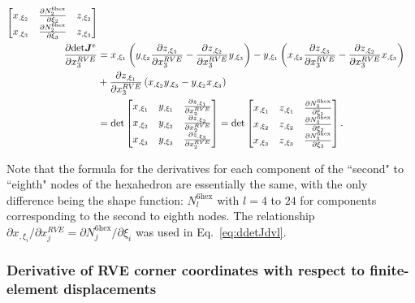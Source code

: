 \begin{align}
\begin{bmatrix}
x_{,\xi_2} & \frac{\partial N_2^{6\text{hex}}}{\partial \xi_2} & z_{,\xi_2} \\
x_{,\xi_3} & \frac{\partial N_2^{6\text{hex}}}{\partial \xi_3} &  z_{,\xi_3}
\end{bmatrix} \nonumber\\
\frac{\partial \text{det}\bm{J}^e}{\partial x_3^{RVE}} &= x_{,\xi_1}\left(y_{,\xi_2} \frac{\partial z_{,\xi_3}}{\partial x_3^{RVE}} - \frac{\partial z_{,\xi_2}}{\partial x_3^{RVE}} y_{,\xi_3} \right) - y_{,\xi_1}\left(x_{,\xi_2}\frac{\partial z_{,\xi_3}}{\partial x_3^{RVE}} - \frac{\partial z_{,\xi_2}}{\partial x_3^{RVE}} x_{,\xi_3} \right) \nonumber \\
& + \frac{\partial z_{,\xi_1}}{\partial x_3^{RVE}}\left(x_{,\xi_2}y_{,\xi_3}-y_{,\xi_2}x_{,\xi_3} \right) \nonumber\\
&= \text{det} \begin{bmatrix}
x_{,\xi_1} & y_{,\xi_1} & \frac{\partial z_{,\xi_1}}{\partial x_2^{RVE}}  \\
x_{,\xi_2} & y_{,\xi_2} & \frac{\partial z_{,\xi_2}}{\partial x_2^{RVE}}  \\
x_{,\xi_3} & y_{,\xi_3} & \frac{\partial z_{,\xi_3}}{\partial x_2^{RVE}} 
\end{bmatrix} 
= \text{det} \begin{bmatrix}
x_{,\xi_1} & z_{,\xi_1} & \frac{\partial N_3^{6\text{hex}}}{\partial \xi_1}  \\
x_{,\xi_2} & z_{,\xi_2} & \frac{\partial N_3^{6\text{hex}}}{\partial \xi_2}  \\
x_{,\xi_3} & z_{,\xi_3}& \frac{\partial N_3^{6\text{hex}}}{\partial \xi_3} 
\end{bmatrix} .
\label{eq:ddetJdvl}
\end{align}

%
Note that the formula for the derivatives for each component of the ``second" to ``eighth" nodes of the hexahedron are essentially the same, with the only difference being the shape function: $N_{l}^{6\text{hex}}$ with $l=4$ to $24$ for components corresponding to the second to eighth nodes. The relationship $\partial x_{,\xi_i}/\partial x_j^{RVE} = \partial N_j^{6\text{hex}}/\partial \xi_i$ was used in Eq.\ \eqref{eq:ddetJdvl}.

\subsubsection{Derivative of RVE corner coordinates with respect to finite-element displacements}

